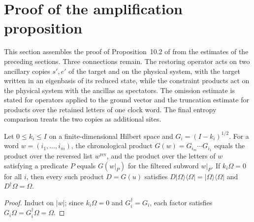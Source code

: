 
\section{Proof of the amplification proposition}

This section assembles the proof of Proposition~10.2 of
\cite{OpenAI2026AreaLaw} from the estimates of the preceding sections. Three
connections remain. The restoring operator acts on two ancillary copies
$s',e'$ of the target and on the physical system, with the target written in
an eigenbasis of its reduced state, while the constraint products act on the
physical system with the ancillas as spectators. The omission estimate is
stated for operators applied to the ground vector and the truncation estimate
for products over the retained letters of one clock word. The final entropy
comparison treats the two copies as additional sites.

\begin{lemma}
    \label{thm:al_amp_constraint_word_lists}
    \leanok
    Let $0\le k_i\le I$ on a finite-dimensional Hilbert space and
    $G_i=(I-k_i)^{1/2}$. For a word $w=(i_1,\dots,i_m)$, the chronological
    product $G(w)=G_{i_m}\cdots G_{i_1}$ equals the product over the reversed
    list $w^{\mathrm{rev}}$, and the product over the letters of $w$ satisfying
    a predicate $P$ equals $G(w|_P)$ for the filtered subword $w|_P$. If
    $k_i\Omega=0$ for all $i$, then every such product $D=G(u)$ satisfies
    $D|\Omega\rangle\langle\Omega|=|\Omega\rangle\langle\Omega|$ and
    $D^\dagger\Omega=\Omega$.
\end{lemma}
\begin{proof}
    \leanok
    Induct on $|w|$; since $k_i\Omega=0$ and $G_i^\dagger=G_i$, each factor
    satisfies $G_i\Omega=G_i^\dagger\Omega=\Omega$.
\end{proof}

